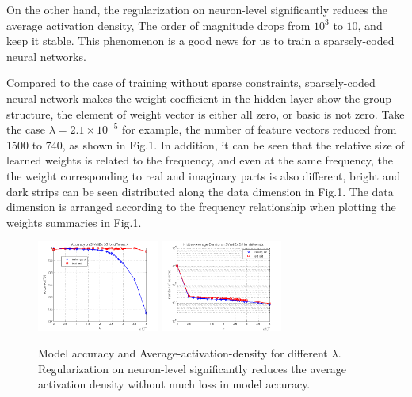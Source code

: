 On the other hand, the regularization on neuron-level significantly reduces the average activation density,
The order of magnitude drops from $10^{3}$ to $10$, and keep it stable. This phenomenon is a good news for us to train a sparsely-coded neural networks.

Compared to the case of training without sparse constraints, sparsely-coded neural network makes the weight coefficient in the hidden layer show the group structure, the element of weight vector is either all zero, or basic is not zero. Take the case $\lambda=2.1 \times 10^{-5} $
for example, the number of feature vectors reduced from 1500 to 740, as shown in Fig.1. In addition, it can be seen that the relative size of learned weights is related to the frequency, and even at the same frequency, the the weight corresponding
to real and imaginary parts is also different, bright and dark strips can be seen distributed along the data dimension in Fig.1. The data dimension is arranged according to the frequency relationship when plotting the weights summaries in Fig.1.

\begin{figure}
\includegraphics[width=4cm,height=3cm]{figure/Accuracy_on_SWellEx_S5_for_different_lambda}
\includegraphics[width=4cm,height=3cm]{figure/Hidden_Average_Density_on_SWellEx_S5_for_different_lambda}
\caption{Model accuracy and Average-activation-density for different $\lambda $.  Regularization on neuron-level
significantly reduces the average activation density without much loss in model accuracy.}
\end{figure}



